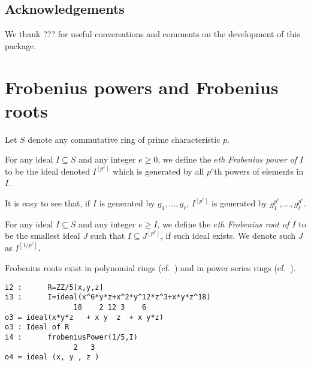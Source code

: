 \documentclass[11pt]{amsart}
\begin{document}
\subsection*{Acknowledgements}

We thank ??? for useful conversations and comments on the development of this package.

\section{Frobenius powers and Frobenius roots}\label{Section: Frobenius powers and Frobenius roots}


Let $S$ denote any commutative ring of prime characteristic $p$.

\begin{definition}
For any ideal $I\subseteq S$ and any integer $e\geq 0$, we define the \emph{$e$th Frobenius power of $I$} to be the ideal denoted $I^{[p^e]}$ which is
generated by all $p^e$th powers of elements in $I$.
\end{definition}

It is easy to see that, if $I$ is generated by $g_1, \dots, g_\ell$, $I^{[p^e]}$ is generated by $g_1^{p^e}, \dots, g_\ell^{p^e}$.


\begin{definition}
For any ideal $I\subseteq S$ and any integer $e\geq I$, we define the \emph{$e$th Frobenius root of $I$} to be the smallest ideal $J$ such that $I\subseteq J^{[p^e]}$, if such ideal exists.
We denote such $J$ as $I^{[1/p^{e}]}$.
\end{definition}

Frobenius roots exist in polynomial rings (cf.~\cite[\S 2]{BlickleMustataSmithDiscretenessAndRationalityOfFThresholds}) and in power series rings
(cf.~\cite[\S 5]{KatzmanParameterTestIdealOfCMRings}).


\begin{verbatim}
i2 :      R=ZZ/5[x,y,z]
i3 :      I=ideal(x^6*y*z+x^2*y^12*z^3+x*y*z^18)
                18    2 12 3    6
o3 = ideal(x*y*z   + x y  z  + x y*z)
o3 : Ideal of R
i4 :      frobeniusPower(1/5,I)
                2   3
o4 = ideal (x, y , z )
\end{verbatim}
\end{document}
